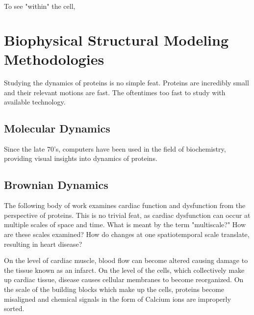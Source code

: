 \documentclass[12pt]{ucsddissertation}
\begin{document}
\begin{dissertationintroduction}
To see "within" the cell, 

\section{Biophysical Structural Modeling Methodologies}
Studying the dynamics of proteins is no simple feat. Proteins are incredibly small and their relevant motions are fast. The oftentimes too fast to study with available technology. 

\subsection{Molecular Dynamics}
Since the late 70's, computers have been used in the field of biochemistry, providing visual insights into dynamics of proteins\cite{McCammon1979}. 

 
\subsection{Brownian Dynamics}

The following body of work examines cardiac function and dysfunction from the  perspective of proteins. This is no trivial feat, as cardiac dysfunction can occur at multiple scales of space and time. What is meant by the term "multiscale?" How are these scales examined? How do changes at one spatiotemporal scale translate, resulting in heart disease? 

 On the level of cardiac muscle, blood flow can become altered causing damage to the tissue known as an infarct. On the level of the cells, which collectively make up cardiac tissue, disease causes cellular membranes to become reorganized. On the scale of the building blocks which make up the cells, proteins become misaligned and chemical signals in the form of Calcium ions are improperly sorted. 
 
 
\end{dissertationintroduction}
\end{document}
